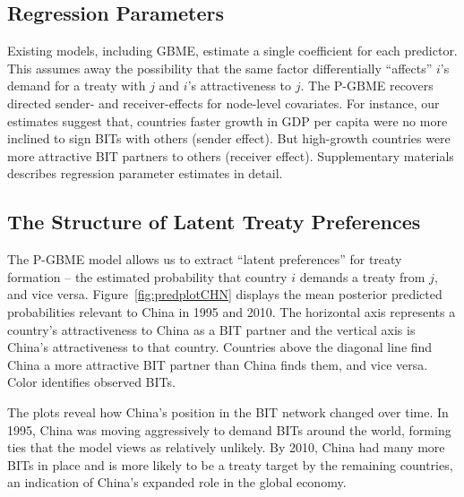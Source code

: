 \subsection{Regression Parameters}

Existing models, including GBME, estimate a single coefficient for each predictor. This assumes away the possibility that the same factor differentially ``affects'' $i$'s demand for a treaty with $j$ and $i$'s attractiveness to $j$.  The P-GBME recovers directed sender- and receiver-effects for node-level covariates. For instance, our estimates suggest that, countries faster growth in GDP per capita were no more inclined to sign BITs with others (sender effect).  But high-growth countries were more attractive BIT partners to others (receiver effect). Supplementary materials describes regression parameter estimates in detail.

\subsection{The Structure of Latent Treaty Preferences}

The P-GBME model allows us to extract ``latent preferences'' for treaty formation -- the estimated probability that country $i$ demands a treaty from $j$, and vice versa. Figure~\ref{fig:predplotCHN} displays the mean posterior predicted probabilities relevant to China in 1995 and 2010. The horizontal axis represents a country's attractiveness to China as a BIT partner and the vertical axis is China's attractiveness to that country. Countries above the diagonal line find China a more attractive BIT partner than China finds them, and vice versa.  Color identifies observed BITs.

The plots reveal how China's position in the BIT network changed over time. In 1995, China was moving aggressively to demand BITs around the world, forming ties that the model views as relatively unlikely. By 2010, China had many more BITs in place and is more likely to be a treaty target by the remaining countries, an indication of China's expanded role in the global economy.  

